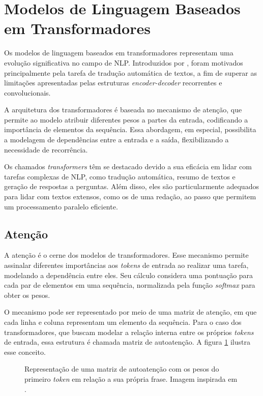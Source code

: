\section{Modelos de Linguagem Baseados em Transformadores}

Os modelos de linguagem baseados em transformadores representam uma evolução significativa no campo de NLP. Introduzidos por \citet{attention2017}, foram motivados principalmente pela tarefa de tradução automática de textos, a fim de superar as limitações apresentadas pelas estruturas \textit{encoder-decoder} recorrentes e convolucionais.

A arquitetura dos transformadores é baseada no mecanismo de atenção, que permite ao modelo atribuir diferentes pesos a partes da entrada, codificando a importância de elementos da sequência. Essa abordagem, em especial, possibilita a modelagem de dependências entre a entrada e a saída, flexibilizando a necessidade de recorrência.

Os chamados \textit{transformers} têm se destacado devido a sua eficácia em lidar com tarefas complexas de NLP, como tradução automática, resumo de textos e geração de respostas a perguntas. Além disso, eles são particularmente adequados para lidar com textos extensos, como os de uma redação, ao passo que permitem um processamento paralelo eficiente.

\subsection{Atenção}

A atenção é o cerne dos modelos de transformadores. Esse mecanismo permite assinalar diferentes importâncias aos \textit{tokens} de entrada ao realizar uma tarefa, modelando a dependência entre eles. Seu cálculo considera uma pontuação para cada par de elementos em uma sequência, normalizada pela função \textit{softmax} para obter os pesos.

O mecanismo pode ser representado por meio de uma matriz de atenção, em que cada linha e coluna representam um elemento da sequência. Para o caso dos transformadores, que buscam modelar a relação interna entre os próprios \textit{tokens} de entrada, essa estrutura é chamada matriz de autoatenção. A figura \ref{fig:self_attention} ilustra esse conceito.

\begin{figure}[H]
    \centering
    \caption{Representação de uma matriz de autoatenção com os pesos do primeiro \textit{token} em relação a sua própria frase. Imagem inspirada em \cite{attention2017}.}
    \label{fig:self_attention}
    \begin{minipage}{0.4\textwidth}
        \centering
        
    \end{minipage}
    \begin{minipage}{0.4\textwidth}
        \centering
        
    \end{minipage}
\end{figure}

